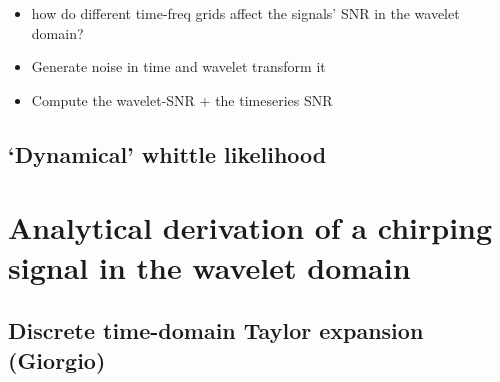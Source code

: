 \documentclass{article}
\begin{document}
\begin{itemize}
    \item how do different time-freq grids affect the signals' SNR in the wavelet domain?
    \item Generate noise in time and wavelet transform it
    \item Compute the wavelet-SNR + the timeseries SNR
\end{itemize}




\subsection{`Dynamical' whittle likelihood}



\newpage

\section{Analytical derivation of a chirping signal in the wavelet domain}

\subsection{Discrete time-domain Taylor expansion (Giorgio)}
\end{document}
